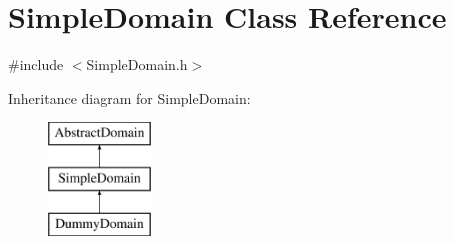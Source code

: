 \hypertarget{class_simple_domain}{}\section{Simple\+Domain Class Reference}
\label{class_simple_domain}


{\ttfamily \#include $<$Simple\+Domain.\+h$>$}

Inheritance diagram for Simple\+Domain\+:\begin{figure}[H]
\begin{center}
\leavevmode
\includegraphics[height=3.000000cm]{class_simple_domain}
\end{center}
\end{figure}
